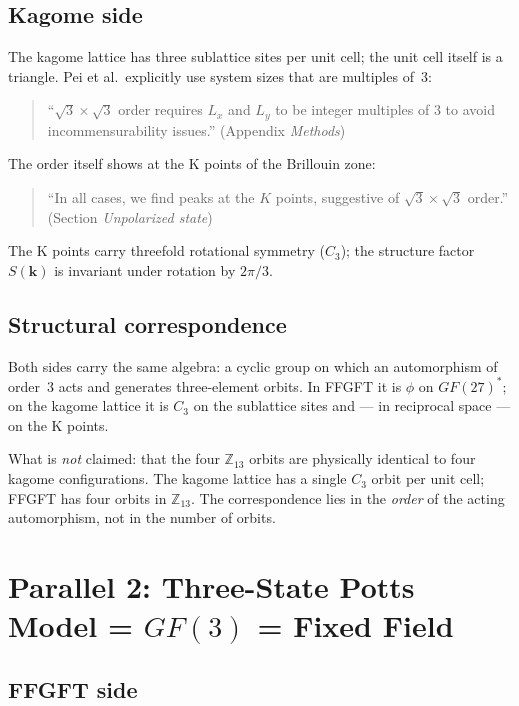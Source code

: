 \subsection{Kagome side}

The kagome lattice has three sublattice sites per unit cell; the unit cell
itself is a triangle. Pei et al.\ explicitly use system sizes that are
multiples of~3:
\begin{quote}\QM
``$\sqrt{3}\times\sqrt{3}$ order requires $L_x$ and $L_y$ to be integer
multiples of 3 to avoid incommensurability issues.''
(Appendix \emph{Methods})
\end{quote}
The order itself shows at the K points of the Brillouin zone:
\begin{quote}\QM
``In all cases, we find peaks at the $K$ points, suggestive of
$\sqrt{3}\times\sqrt{3}$ order.'' (Section \emph{Unpolarized state})
\end{quote}
The K points carry threefold rotational symmetry ($C_3$); the structure
factor $S(\mathbf{k})$ is invariant under rotation by $2\pi/3$.

\subsection{Structural correspondence}

Both sides carry the same algebra: a cyclic group on which an automorphism
of order~3 acts and generates three-element orbits. In FFGFT it is $\phi$ on
$GF(27)^*$; on the kagome lattice it is $C_3$ on the sublattice sites and ---
in reciprocal space --- on the K points. \SM

What is \emph{not} claimed: that the four $\mathbb{Z}_{13}$ orbits are
physically identical to four kagome configurations. The kagome lattice has a
single $C_3$ orbit per unit cell; FFGFT has four orbits in $\mathbb{Z}_{13}$.
The correspondence lies in the \emph{order} of the acting automorphism, not
in the number of orbits.

\section{Parallel 2: Three-State Potts Model = $GF(3)$ = Fixed Field}

\subsection{FFGFT side}

